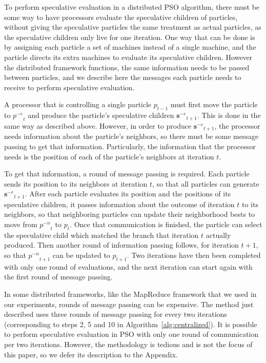 \documentclass[journal,letterpaper]{IEEEtran}
\newcommand{\alg}[1]{Algorithm~\ref{alg:#1}}
\providecommand{\noeval}[1]{\ensuremath{#1^{-e}}}
\providecommand{\nonbest}[1]{\ensuremath{#1^{-n}}}
\providecommand{\p}{\ensuremath{p}}
\providecommand{\sset}{\ensuremath{\mathbf{s}}}
\begin{document}
To perform speculative evaluation in a distributed PSO algorithm, there must be
some way to have processors evaluate the speculative children of particles,
without giving the speculative particles the same treatment as actual
particles, as the speculative children only live for one iteration.  One way
that can be done is by assigning each particle a set of machines instead of a
single machine, and the particle directs its extra machines to evaluate its
speculative children.  However the distributed framework functions, the same
information needs to be passed between particles, and we describe here the
messages each particle needs to receive to perform speculative evaluation.

A processor that is controlling a single particle $\p_{t-1}$ must first move
the particle to $\noeval{\p}_t$ and produce the particle's speculative children
$\noeval{\sset}_{t+1}$.  This is done in the same way as described above.
However, in order to produce $\noeval{\sset}_{t+1}$, the processor needs
information about the particle's neighbors, so there must be some message
passing to get that information.  Particularly, the information that the
processor needs is the position of each of the particle's neighbors at
iteration $t$.

To get that information, a round of message passing is required.  Each particle
sends its position to its neighbors at iteration $t$, so that all particles can
generate $\noeval{\sset}_{t+1}$.  After each particle evaluates its position
and the positions of its speculative children, it passes information about the
outcome of iteration $t$ to its neighbors, so that neighboring particles can
update their neighborhood bests to move from $\nonbest{\p}_t$ to $\p_t$.  Once
that communication is finished, the particle can select the speculative child
which matched the branch that iteration $t$ actually produced.  Then another
round of information passing follows, for iteration $t+1$, so that
$\nonbest{\p}_{t+1}$ can be updated to $\p_{t+1}$.  Two iterations have then
been completed with only one round of evaluations, and the next iteration can
start again with the first round of message passing.

In some distributed frameworks, like the MapReduce framework that we used in
our experiments, rounds of message passing can be expensive.  The method just
described uses three rounds of message passing for every two iterations
(corresponding to steps 2, 5 and 10 in \alg{centralized}).  It is possible to
perform speculative evaluation in PSO with only one round of communication per
two iterations.  However, the methodology is tedious and is not the focus of
this paper, so we defer its description to the Appendix.
\end{document}
